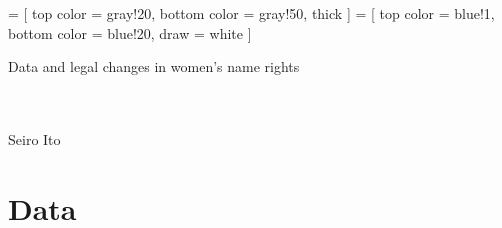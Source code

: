 

\makeatletter
\g@addto@macro{\UrlBreaks}{\UrlOrds}
\newcommand\gobblepars{%
    \@ifnextchar\par%
        {\expandafter\gobblepars\@gobble}%
        {}}
\makeatother
\def\pgfsysdriver{pgfsys-dvipdfm.def}
\usepackage{tikz}
\usetikzlibrary{calc, arrows, decorations, decorations.pathreplacing, backgrounds}
\usepackage{adjustbox}
\usepackage{longtable}
\usepackage[group-separator={,}, group-minimum-digits=4]{siunitx}
\renewcommand\Routcolor{\color{gray30}}
\renewcommand{\appendixname}{}

 =
[
top color = gray!20, bottom color = gray!50, thick
]
 =
[
top color = blue!1, bottom color = blue!20, draw = white
]



\setlength{\baselineskip}{12pt}





\hfil Data and legal changes in women's name rights\\

\hfil\MonthDY\\
\hfil{\footnotesize\currenttime}\\
\renewcommand{\thefootnote}{*\arabic{footnote}}

\hfil Seiro Ito

\setcounter{tocdepth}{3}
\tableofcontents

\setlength{\parindent}{1em}
\vspace{2ex}


\section{Data}


















